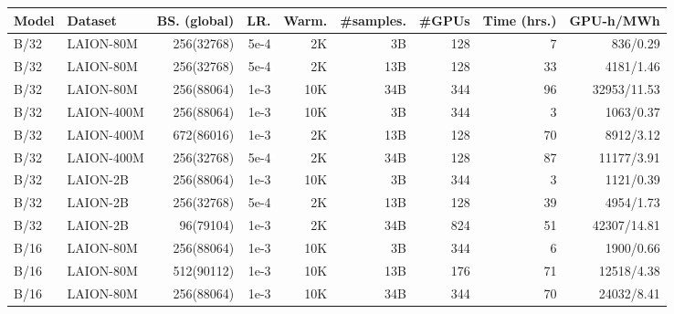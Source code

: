 \begin{appendix}
\begin{table}[ht]
\centering
\setlength\tabcolsep{5pt}
\footnotesize
{}
\begin{tabular}{@{}llrrrrrrr@{}}
\toprule
\textbf{Model} & \textbf{Dataset} & \textbf{BS. (global)} & \textbf{LR.} & \textbf{Warm.} & \textbf{\#samples}. &  \textbf{\#GPUs} & \textbf{Time (hrs.)} & \textbf{GPU-h}/\textbf{MWh} \\ \midrule
B/32 & LAION-80M & 256(32768) & 5e-4 & 2K & 3B & 128 & 7 & 836/0.29 \\
B/32 & LAION-80M & 256(32768) & 5e-4 & 2K & 13B & 128 & 33 & 4181/1.46 \\
B/32 & LAION-80M & 256(88064) & 1e-3 & 10K & 34B & 344 & 96 & 32953/11.53 \\
B/32 & LAION-400M & 256(88064) & 1e-3 & 10K & 3B & 344 & 3 & 1063/0.37 \\
B/32 & LAION-400M & 672(86016) & 1e-3 & 2K & 13B & 128 & 70 & 8912/3.12 \\
B/32 & LAION-400M & 256(32768) & 5e-4 & 2K & 34B & 128 & 87 & 11177/3.91 \\
B/32 & LAION-2B & 256(88064) & 1e-3 & 10K & 3B & 344 & 3 & 1121/0.39 \\
B/32 & LAION-2B & 256(32768) & 5e-4 & 2K & 13B & 128 & 39 & 4954/1.73 \\
B/32 & LAION-2B & 96(79104) & 1e-3 & 2K & 34B & 824 & 51 & 42307/14.81 \\
B/16 & LAION-80M & 256(88064) & 1e-3 & 10K & 3B & 344 & 6 & 1900/0.66 \\
B/16 & LAION-80M & 512(90112) & 1e-3 & 10K & 13B & 176 & 71 & 12518/4.38 \\
B/16 & LAION-80M & 256(88064) & 1e-3 & 10K & 34B & 344 & 70 & 24032/8.41 \\

\end{tabular}
\end{table}
\end{appendix}
